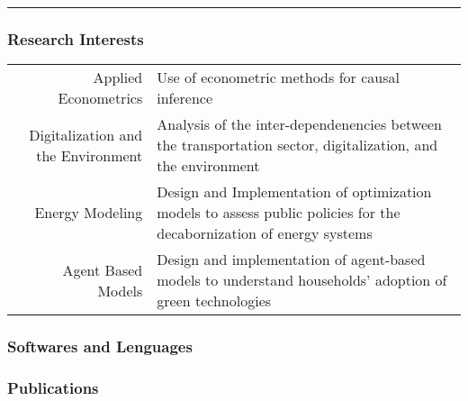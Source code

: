 \documentclass[
  0.8em,
  letterpaper,
  DIV=11,
  numbers=noendperiod]{scrartcl}
\begin{document}
\begin{center}\rule{0.5\linewidth}{0.5pt}\end{center}

\hypertarget{fa-book-open-research-interests}{%
\subsubsection{\texorpdfstring{ Research
Interests}{ Research Interests}}\label{fa-book-open-research-interests}}

\begin{longtable}[]{@{}rl@{}}
\toprule()
\endhead
Applied Econometrics & Use of econometric methods for causal
inference \\
Digitalization and the Environment & Analysis of the
inter-dependenencies between the transportation sector, digitalization,
and the environment \\
Energy Modeling & Design and Implementation of optimization models to
assess public policies for the decabornization of energy systems \\
Agent Based Models & Design and implementation of agent-based models to
understand households' adoption of green technologies \\
\bottomrule()
\end{longtable}

\hypertarget{fa-language-softwares-and-lenguages}{%
\subsubsection{\texorpdfstring{ Softwares and
Lenguages}{ Softwares and Lenguages}}\label{fa-language-softwares-and-lenguages}}

\begin{figure}

\begin{minipage}[t]{0.50\linewidth}

{\centering 

}

\end{minipage}%
%
\begin{minipage}[t]{0.50\linewidth}

{\centering 

}

\end{minipage}%

\end{figure}

\hypertarget{ai-archive-publications}{%
\subsubsection{\texorpdfstring{
Publications}{ Publications}}\label{ai-archive-publications}}
\end{document}
